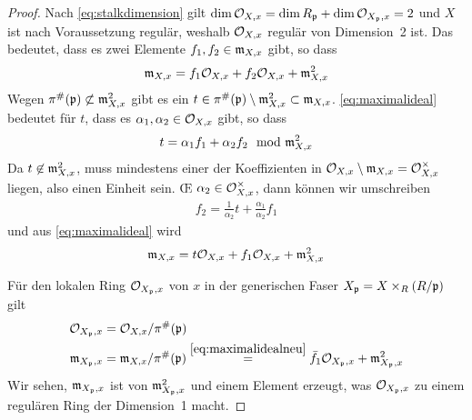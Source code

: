 \documentclass[german, bibliography=totoc]{scrreprt}
\begin{document}
\begin{Lemma}
\begin{proof}
    Nach \ref{eq:stalkdimension} gilt
    $\dim\mathcal{O}_{X,x}=\dim R_{\mathfrak{p}}+\dim\mathcal{O}_{X_{\mathfrak{p}},x}=2$ und $X$ ist nach
    Voraussetzung regulär, weshalb $\mathcal{O}_{X,x}$ regulär von Dimension~2
    ist. Das bedeutet, dass es zwei Elemente $f_1, f_2\in\mathfrak{m}_{X,x}$
    gibt, so dass
    \begin{gather}\label{eq:maximalideal}
      \mathfrak{m}_{X,x} = f_1\mathcal{O}_{X,x} + f_2\mathcal{O}_{X,x} + \mathfrak{m}_{X,x}^2
    \end{gather}
    Wegen $\pi^\#(\mathfrak{p})\not\subset\mathfrak{m}_{X,x}^2$ gibt es ein
    $t\in\pi^\#(\mathfrak{p})\setminus\mathfrak{m}_{X,x}^2\subset\mathfrak{m}_{X,x}$.
    \eqref{eq:maximalideal} bedeutet für $t$, dass es $\alpha_1,
    \alpha_2\in\mathcal{O}_{X,x}$ gibt, so dass
    \begin{gather*}
      t = \alpha_1 f_1 + \alpha_2 f_2 \mod {\mathfrak{m}}_{X,x}^2
    \end{gather*}
    Da $t\not\in\mathfrak{m}_{X,x}^2$, muss mindestens einer der Koeffizienten
    in $\mathcal{O}_{X,x}\setminus\mathfrak{m}_{X,x}=\mathcal{O}_{X,x}^\times$ liegen, also einen
    Einheit sein. \OE{} $\alpha_2\in\mathcal{O}_{X,x}^\times$, dann können wir
    umschreiben
    \begin{gather*}
      f_2 = \frac{1}{\alpha_2}t + \frac{\alpha_1}{\alpha_2}f_1 
    \end{gather*}
    und aus \eqref{eq:maximalideal} wird
    \begin{gather}\label{eq:maximalidealneu}
      \mathfrak{m}_{X,x} = t\mathcal{O}_{X,x} + f_1\mathcal{O}_{X,x} + \mathfrak{m}_{X,x}^2
    \end{gather}

    Für den lokalen Ring $\mathcal{O}_{X_{\mathfrak{p}},x}$ von $x$ in der generischen
    Faser $X_{\mathfrak{p}} = X\times_R (R/\mathfrak{p})$ gilt
    \begin{align*}
      \mathcal{O}_{X_{\mathfrak{p}},x} &= \mathcal{O}_{X,x}/\pi^\#(\mathfrak{p})\\
      \mathfrak{m}_{X_{\mathfrak{p}},x} &= \mathfrak{m}_{X,x}/\pi^\#(\mathfrak{p})
                    \overset{\eqref{eq:maximalidealneu}}{=}
                    \bar f_1\mathcal{O}_{X_{\mathfrak{p}},x} + \mathfrak{m}_{X_{\mathfrak{p}},x}^2
    \end{align*}
    Wir sehen, $\mathfrak{m}_{X_{\mathfrak{p}},x}$ ist von $\mathfrak{m}_{X_{\mathfrak{p}},x}^2$ und einem Element
    erzeugt, was $\mathcal{O}_{X_{\mathfrak{p}},x}$ zu einem regulären Ring der Dimension~1
    macht.
  \end{proof}
\end{Lemma}
\end{document}
